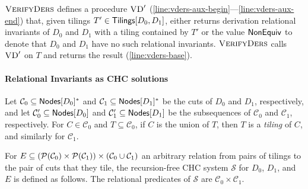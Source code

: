 $\textsc{VerifyDers}$ defines a procedure $\textsc{VD}'$
(\autoref{line:vders-aux-begin}---\autoref{line:vders-aux-end}) that,
given tilings $T' \in \mathsf{Tilings}[ D_0, D_1 ]$, either returns derivation
relational invariants of $D_0$ and $D_1$ with a tiling contained by
$T'$ or the value $\mathsf{NonEquiv}$ to denote that $D_0$ and $D_1$ have no
such relational invariants.
%
$\textsc{VerifyDers}$ calls $\textsc{VD}'$ on $T$ and returns the result
(\autoref{line:vders-base}).
%

% 

\paragraph{Relational Invariants as CHC solutions}
Let $\mathcal{C}_0 \subseteq \mathsf{Nodes}[ D_0 ]^{*}$ and $\mathcal{C}_1
\subseteq \mathsf{Nodes}[ D_1 ]^{*}$ be the cuts of $D_0$ and $D_1$,
respectively, and let $\mathcal{C}_0' \subseteq \mathsf{Nodes}[ D_0 ]$ and
$\mathcal{C}_1' \subseteq \mathsf{Nodes}[ D_1 ]$ be the subsequences of
$\mathcal{C}_0$ and $\mathcal{C}_1$, respectively.
%
For $C \in \mathcal{C}_0$ and $T \subseteq \mathcal{C}_0$, if $C$ is
the union of $T$, then $T$ is a \emph{tiling} of $C$, and similarly
for $\mathcal{C}_1$.

For $E \subseteq (\mathcal{P}(\mathcal{C}_0) \times \mathcal{P}(\mathcal{C}_1))
\times (\mathcal{C}_0 \cup \mathcal{C}_1)$ an arbitrary relation
from pairs of tilings to the pair of cuts that they tile, the
recursion-free CHC system $\mathcal{S}$ for $D_0$, $D_1$, and $E$ is
defined as follows.
%
The relational predicates of $\mathcal{S}$ are $\mathcal{C}_0 \times
\mathcal{C}_1$.

